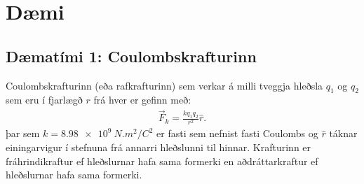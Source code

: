 \section{Dæmi}

\subsection*{Dæmatími 1: Coulombskrafturinn}

\begin{tcolorbox}
Coulombskrafturinn (eða rafkrafturinn) sem verkar á milli tveggja hleðsla $q_1$ og $q_2$ sem eru í fjarlægð $r$ frá hver er gefinn með:
\begin{align*}
    \vec{F}_k = \frac{kq_1 q_2}{r^2} \hat{r}.
\end{align*}
þar sem $k = \SI{8.98e9}{N.m^2/C^2}$ er fasti sem nefnist fasti Coulombs og $\hat{r}$ táknar einingarvigur í stefnuna frá annarri hleðslunni til hinnar. Krafturinn er fráhrindikraftur ef hleðslurnar hafa sama formerki en aðdráttarkraftur ef hleðslurnar hafa sama formerki.
\end{tcolorbox}

